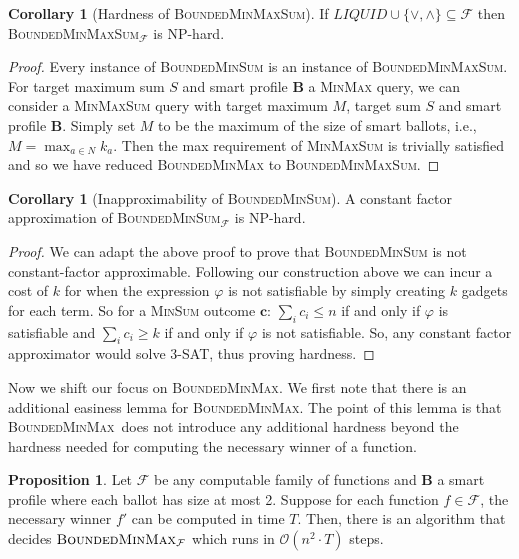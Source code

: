 \documentclass[11pt,a4paper, titlepage]{article}
\theoremstyle{definition}
\newtheorem{corollary}[theorem]{Corollary}
\newtheorem{proposition}[theorem]{Proposition}
\let\vec\mathbf
\newcommand{\BMM}{\textsc{BoundedMinMax}}
\begin{document}
\begin{corollary}[Hardness of \textsc{BoundedMinMaxSum}]
    If $ \mathit{LIQUID} \cup \{\lor, \land\} \subseteq \mathcal{F}$ then \textsc{BoundedMinMaxSum}$_\mathcal{F}$ is NP-hard. 
\end{corollary}

\begin{proof}
    Every instance of \textsc{BoundedMinSum} is an instance of \textsc{BoundedMinMaxSum}. For target maximum sum $S$ and smart profile $\vec{B}$ a \textsc{MinMax} query, we can consider a \textsc{MinMaxSum} query with target maximum $M$, target sum $S$ and smart profile $\vec{B}$. Simply set $M$ to be the maximum of the size of smart ballots, i.e., $M = \max_{a \in N} k_a$. Then the max requirement of \textsc{MinMaxSum} is trivially satisfied and so we have reduced \textsc{BoundedMinMax} to \textsc{BoundedMinMaxSum}.
\end{proof}


\begin{corollary}[Inapproximability of \textsc{BoundedMinSum}] A constant factor approximation of \textsc{BoundedMinSum}$_\mathcal{F}$ is NP-hard.    
\end{corollary}

\begin{proof}
    We can adapt the above proof to prove that \textsc{BoundedMinSum} is not constant-factor approximable. 
    Following our construction above we can incur a cost of $k$ for when the expression $\varphi$ is not satisfiable by simply creating $k$ gadgets for each term. 
    So for a \textsc{MinSum} outcome $\vec{c}$:   $\sum_i c_i \leq n$ if and only if $\varphi$ is satisfiable and $\sum_i c_i \geq k$ if and only if $\varphi$ is not satisfiable. 
    So, any constant factor approximator would solve \textsc{3-SAT}, thus proving hardness.
\end{proof}

Now we shift our focus on \textsc{BoundedMinMax}.
We first note that there is an additional easiness lemma for \BMM.
The point of this lemma is that \BMM\ does not introduce any additional hardness beyond the hardness needed for computing the necessary winner of a function.

\begin{proposition}
    Let $\mathcal{F}$ be any computable family of functions and $\vec{B}$ a smart profile where each ballot has size at most 2.
    Suppose for each function $f \in \mathcal{F}$, the necessary winner $f'$ can be computed in time $T$.
    Then, there is an algorithm that decides $\BMM_\mathcal{F}$ which runs in $\mathcal{O}(n^2\cdot T)$ steps. 
\end{proposition}
\end{document}
